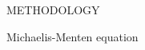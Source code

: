 



\def\clim{$C_{lim}$}
\def\c2{$C_2$}
\def\im{$I_m$}
\def\km{$K_m$}

\cleardoublepage
\chap METHODOLOGY

\sec Michaelis-Menten equation

